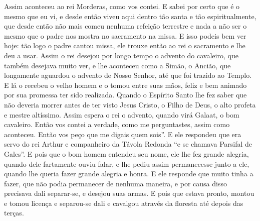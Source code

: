 Assim aconteceu ao rei Morderas, como vos contei. E sabei por certo que é o
mesmo que eu vi, e desde então viveu aqui dentro tão santa e tão
espiritualmente, que desde então não mais comeu nenhuma refeição terrestre e
nada a não ser o mesmo que o padre nos mostra no sacramento na missa. E isso
podeis bem ver hoje: tão logo o padre cantou missa, ele trouxe então ao rei o
sacramento e lhe deu a usar. Assim o rei desejou por longo tempo o advento do
cavaleiro, que também desejava muito ver, e lhe aconteceu como a Simão, o
Ancião, que longamente aguardou o advento de Nosso Senhor, até que foi trazido
ao Templo. E lá o recebeu o velho homem e o tomou entre suas mãos, feliz e bem
animado por sua promessa ter sido realizada. Quando o Espírito Santo lhe fez
saber que não deveria morrer antes de ter visto Jesus Cristo, o Filho de Deus,
o alto profeta e mestre altíssimo. Assim espera o rei o advento, quando virá
Galaat, o bom cavaleiro. Então vos contei a verdade, como me perguntastes,
assim como aconteceu. Então vos peço que me digais quem sois”.
E ele respondeu que era servo do rei Arthur e companheiro da Távola Redonda “e
se chamava Parsifal de Gales”. E pois que o bom homem entendeu seu nome, ele
lhe fez grande alegria, quando dele fartamente ouviu falar, e lhe pediu assim
permanecesse junto a ele, quando lhe queria fazer grande alegria e honra. E ele
responde que muito tinha a fazer, que não podia permanecer de nenhuma maneira,
e por causa disso precisava dali separar-se, e desejou suas armas. E pois que
estava pronto, montou e tomou licença e separou-se dali e cavalgou através da
floresta até depois das terças. 


